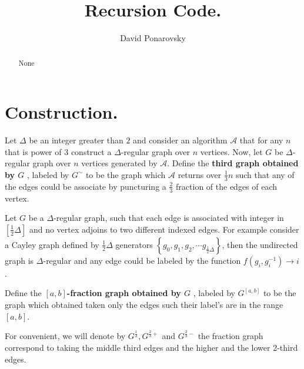 \documentclass{article}
\begin{document}
\title{Recursion Code.} 
\author{David Ponarovsky}
\maketitle
\begin{abstract}None 
\end{abstract}

\section{Construction.}
\begin{definition} 
  Let $\Delta$ be an integer greater than $2$ and consider an algorithm $\mathcal{A}$ that for any $n$ that is power of $3$ construct a $\Delta$-regular graph over $n$ vertices. Now, let $G$ be $\Delta$-regular graph over $n$ vertices generated by $\mathcal{A}$. Define the \textbf{third graph obtained by $G$ } , labeled by $G^{\sim}$ to be the graph which $\mathcal{A}$ returns over $\frac{1}{3} n$ such that any of the edges could be associate by puncturing a $\frac{2}{3}$ fraction of the edges of each vertex.  
\end{definition}

\begin{definition}
  Let $G$ be a $\Delta$-regular graph, such that each edge is associated with integer in $[\frac{1}{2}\Delta]$ and no vertex adjoins to two different indexed edges. For example consider a Cayley graph defined by $\frac{1}{2}\Delta$ generators $\left\{g_{0},g_{1},g_{2},\cdots g_{\frac{1}{2}\Delta} \right\}$, then the undirected graph is $\Delta$-regular and any edge could be labeled by the function $ f\left( g_{i}, g_{i}^{-1} \right) \rightarrow i$.

  Define the \textbf{$[a,b]$-fraction graph obtained by $G$ }, labeled by $G^{[a,b]}$ to be the graph which obtained taken only the edges such their label's are in the range $[a,b]$. 

  For convenient, we will denote by $G^{\frac{1}{3}}, G^{\frac{2}{3}+}$ and $G^{\frac{2}{3}-}$ the fraction graph correspond to taking the middle third edges and the higher and the lower 2-third edges.  
\end{definition}
\end{document}
